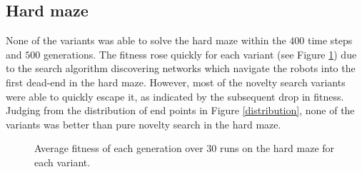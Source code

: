 \subsection{Hard maze}
None of the variants was able to solve the hard maze within the $400$ time steps and $500$ generations.
The fitness rose quickly for each variant (see Figure \ref{hard_fitness}) due to the search algorithm
discovering networks which navigate the robots into the first dead-end in the hard maze.
However, most of the novelty search variants
were able to quickly escape it, as indicated by the subsequent drop in fitness.
Judging from the distribution of end points in Figure \ref{distribution}, none of the variants
was better than pure novelty search in the hard maze.

\begin{figure}[H]
    \begin{center}
        
    \end{center}
    \caption{Average fitness of each generation over 30 runs on the hard maze for each variant.}
    \label{hard_fitness}
\end{figure}

